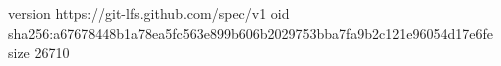 version https://git-lfs.github.com/spec/v1
oid sha256:a67678448b1a78ea5fc563e899b606b2029753bba7fa9b2c121e96054d17e6fe
size 26710
